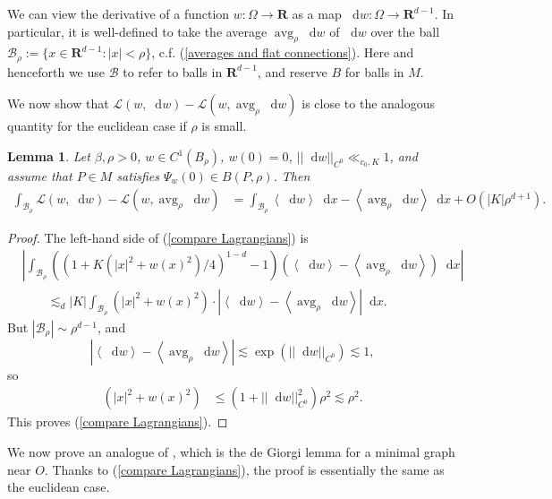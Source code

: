 \documentclass[reqno,11pt]{amsart}
\newcommand{\RR}{\mathbf{R}}
\DeclareMathOperator{\avg}{avg}
\newcommand*\dif{\mathop{}\!\mathrm{d}}
\newcommand{\Lagrange}{\mathscr L}
\def\Japan#1{\left \langle #1 \right \rangle}
\newtheorem{lemma}[theorem]{Lemma}
\theoremstyle{definition}
\numberwithin{equation}{section}
\begin{document}
We can view the derivative of a function $w: \Omega \to \RR$ as a map $\dif w: \Omega \to \RR^{d - 1}$.
In particular, it is well-defined to take the average $\avg_\rho \dif w$ of $\dif w$ over the ball $\mathscr B_\rho := \{x \in \RR^{d - 1}: |x| < \rho\}$, c.f. (\ref{averages and flat connections}).
Here and henceforth we use $\mathscr B$ to refer to balls in $\RR^{d - 1}$, and reserve $B$ for balls in $M$.

We now show that $\Lagrange(w, \dif w) - \Lagrange(w, \avg_\rho \dif w)$ is close to the analogous quantity for the euclidean case if $\rho$ is small.

\begin{lemma}
Let $\beta, \rho > 0$, $w \in C^1(B_\rho)$, $w(0) = 0$, $||\dif w||_{C^0} \ll_{c_0, K} 1$, and assume that $P \in M$ satisfies $\Psi_w(0) \in B(P, \rho)$. Then
\begin{align}
\int_{\mathscr B_\rho} \Lagrange(w, \dif w) - \Lagrange(w, \avg_\rho \dif w)
&= \int_{\mathscr B_\rho} \Japan{\dif w} \dif x - \Japan{\avg_\rho \dif w} \dif x + O(|K| \rho^{d + 1}) \label{compare Lagrangians}.
\end{align}
\end{lemma}
\begin{proof}
The left-hand side of (\ref{compare Lagrangians}) is
\begin{align*}
&\left|\int_{\mathscr B_\rho} ((1 + K(|x|^2 + w(x)^2)/4)^{1 - d} - 1)(\Japan{\dif w} - \Japan{\avg_\rho \dif w}) \dif x\right| \\
&\qquad \lesssim_d |K| \int_{\mathscr B_\rho} (|x|^2 + w(x)^2) \cdot \left|\Japan{\dif w} - \Japan{\avg_\rho \dif w}\right| \dif x.
\end{align*}
But $|\mathscr B_\rho| \sim \rho^{d - 1}$, and
$$|\Japan{\dif w} - \Japan{\avg_\rho \dif w}| \lesssim \exp(||\dif w||_{C^0}) \lesssim 1,$$
so
\begin{align*}
(|x|^2 + w(x)^2) &\leq (1 + ||\dif w||_{C^0}^2) \rho^2 \lesssim \rho^2.
\end{align*}
This proves (\ref{compare Lagrangians}).
\end{proof}

We now prove an analogue of \cite[Lemma 6.3]{Giusti77}, which is the de Giorgi lemma for a minimal graph near $O$.
Thanks to (\ref{compare Lagrangians}), the proof is essentially the same as the euclidean case.
\end{document}
